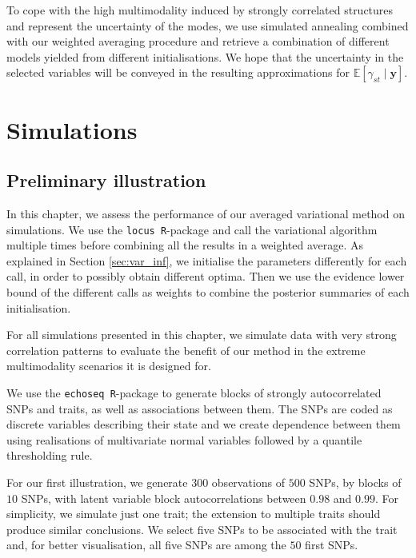 \documentclass[a4paper, 11pt]{report}
\numberwithin{equation}{chapter}
\begin{document}
To cope with the high multimodality induced by strongly correlated structures and represent the uncertainty of the modes, we use simulated annealing combined with our weighted averaging procedure and retrieve a combination of different models yielded from different initialisations. We hope that the uncertainty in the selected variables will be conveyed in the resulting approximations for $\mathbb{E}\left[\gamma_{st}\mid \boldsymbol{y}\right]$.

\newpage
\chapter{Simulations}
\section{Preliminary illustration}
In this chapter, we assess the performance of our averaged variational method on simulations. We use the \texttt{locus R}-package \citep{r_locus} and call the variational algorithm multiple times before combining all the results in a weighted average. As explained in Section \ref{sec:var_inf}, we initialise the parameters differently for each call, in order to possibly obtain different optima. Then we use the evidence lower bound of the different calls as weights to combine the posterior summaries of each initialisation. 

For all simulations presented in this chapter, we simulate data with very strong correlation patterns to evaluate the benefit of our method in the extreme multimodality scenarios it is designed for.

We use the \texttt{echoseq R}-package \citep{r_echoseq} to generate blocks of strongly autocorrelated SNPs and traits, as well as associations between them. The SNPs are coded as discrete variables describing their state and we create dependence between them using realisations of multivariate normal variables followed by a quantile thresholding rule.

For our first illustration, we generate $300$ observations of $500$ SNPs, by blocks of $10$ SNPs, with latent variable block autocorrelations between $0.98$ and $0.99$. For simplicity, we simulate just one trait; the extension to multiple traits should produce similar conclusions. We select five SNPs to be associated with the trait and, for better visualisation, all five SNPs are among the $50$ first SNPs.
\end{document}
